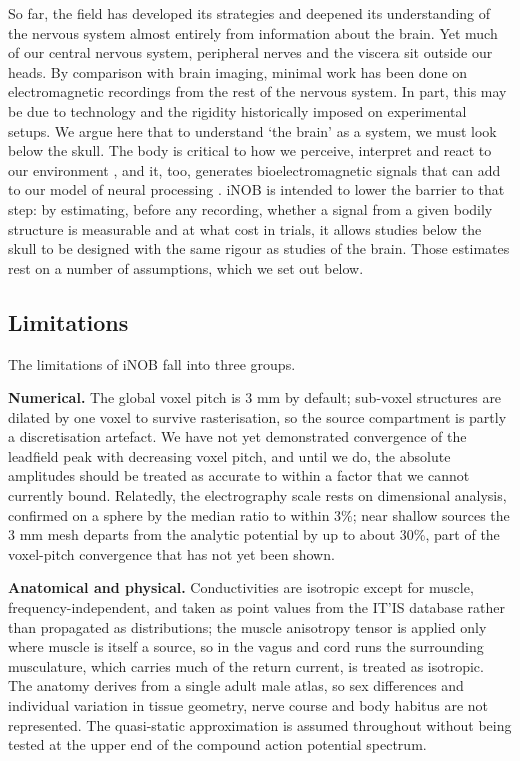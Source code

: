 \documentclass[11pt]{article}
\newcommand{\revised}[1]{#1}
\begin{document}
So far, the field has developed its strategies and deepened its
understanding of the nervous system almost entirely from information
about the brain. Yet much of our central nervous system, peripheral
nerves and the viscera sit outside our heads. By comparison with brain
imaging, minimal work has been done on electromagnetic recordings from
the rest of the nervous system. In part, this may be due to technology
and the rigidity historically imposed on experimental setups. We argue
here that to understand `the brain' as
a system, we must look below the skull. The body is critical to how we
perceive, interpret and react to our environment \citep{200, 201}, and
it, too, generates bioelectromagnetic signals that can add to our model
of neural processing \citep{199}. iNOB is intended to lower the barrier
to that step: by estimating, before any recording, whether a signal from
a given bodily structure is measurable and at what cost in trials, it
allows studies below the skull to be designed with the same rigour as
studies of the brain. Those estimates rest on a number of assumptions,
which we set out below.

\subsection{Limitations}\label{limitations}

The limitations of iNOB fall into three groups.

\textbf{Numerical.} The global voxel pitch is 3 mm by default; sub-voxel
structures are dilated by one voxel to survive rasterisation, so the
source compartment is partly a discretisation artefact. We have not yet
demonstrated convergence of the leadfield peak with decreasing voxel
pitch, and until we do, the absolute amplitudes should be treated as
accurate to within a factor that we cannot currently bound. \revised{Relatedly, the
electrography scale rests on dimensional analysis, confirmed on a
sphere by the median ratio to within 3\%; near shallow sources the 3 mm
mesh departs from the analytic potential by up to about 30\%, part of
the voxel-pitch convergence that has not yet been shown.}

\textbf{Anatomical and physical.} Conductivities are isotropic except
for muscle, frequency-independent, and taken as point values from the
IT'IS database rather than propagated as distributions;
the muscle anisotropy tensor is applied only where muscle is itself a
source, so in the vagus and cord runs the surrounding musculature, which
carries much of the return current, is treated as isotropic. The anatomy
derives from a single adult male atlas, so sex differences and
individual variation in tissue geometry, nerve course and body habitus
are not represented. The quasi-static approximation is assumed throughout
without being tested at the upper end of the compound action potential
spectrum.
\end{document}
